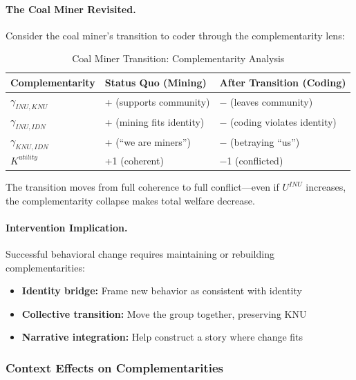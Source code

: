 \paragraph{The Coal Miner Revisited.}
Consider the coal miner's transition to coder through the complementarity lens:

\begin{table}[htbp]
\centering
\caption{Coal Miner Transition: Complementarity Analysis}
\label{tab:miner-complementarity}
\renewcommand{\arraystretch}{1.3}
\begin{tabular}{@{}lll@{}}
\toprule
\textbf{Complementarity} & \textbf{Status Quo (Mining)} & \textbf{After Transition (Coding)} \\
\midrule
$\gamma_{INU,KNU}$ & + (supports community) & $-$ (leaves community) \\
$\gamma_{INU,IDN}$ & + (mining fits identity) & $-$ (coding violates identity) \\
$\gamma_{KNU,IDN}$ & + (``we are miners'') & $-$ (betraying ``us'') \\
\midrule
$K^{utility}$ & +1 (coherent) & $-$1 (conflicted) \\
\bottomrule
\end{tabular}
\end{table}

The transition moves from full coherence to full conflict---even if $U^{INU}$ 
increases, the complementarity collapse makes total welfare decrease.

\paragraph{Intervention Implication.}
Successful behavioral change requires maintaining or rebuilding complementarities:
\begin{itemize}
\item \textbf{Identity bridge:} Frame new behavior as consistent with identity
\item \textbf{Collective transition:} Move the group together, preserving KNU
\item \textbf{Narrative integration:} Help construct a story where change fits
\end{itemize}

\subsubsection{Context Effects on Complementarities}

